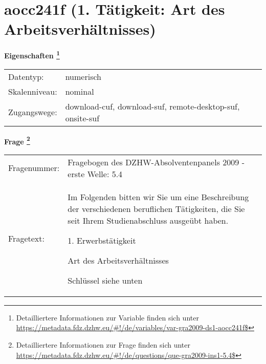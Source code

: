 
    \setcounter{footnote}{0}

    \vspace*{-1.8cm}
	\section{aocc241f (1. Tätigkeit: Art des Arbeitsverhältnisses)}
	\label{section:aocc241f}



    \vspace*{0.5cm}
    \noindent\textbf{Eigenschaften
	\footnote{Detailliertere Informationen zur Variable finden sich unter
		\url{https://metadata.fdz.dzhw.eu/\#!/de/variables/var-gra2009-ds1-aocc241f$}}}\\
	\begin{tabularx}{\hsize}{@{}lX}
	Datentyp: & numerisch \\
	Skalenniveau: & nominal \\
	Zugangswege: &
	  download-cuf, 
	  download-suf, 
	  remote-desktop-suf, 
	  onsite-suf
 \\
    \end{tabularx}



				\vspace*{0.5cm}
                \noindent\textbf{Frage
	                \footnote{Detailliertere Informationen zur Frage finden sich unter
		              \url{https://metadata.fdz.dzhw.eu/\#!/de/questions/que-gra2009-ins1-5.4$}}}\\
				\begin{tabularx}{\hsize}{@{}lX}
					Fragenummer: &
					  Fragebogen des DZHW-Absolventenpanels 2009 - erste Welle:
					  5.4
 \\
					Fragetext: & Im Folgenden bitten wir Sie um eine Beschreibung der verschiedenen beruflichen Tätigkeiten, die Sie seit Ihrem Studienabschluss ausgeübt haben.\par  1. Erwerbstätigkeit\par  Art des Arbeitsverhältnisses\par  Schlüssel siehe unten \\
				\end{tabularx}





